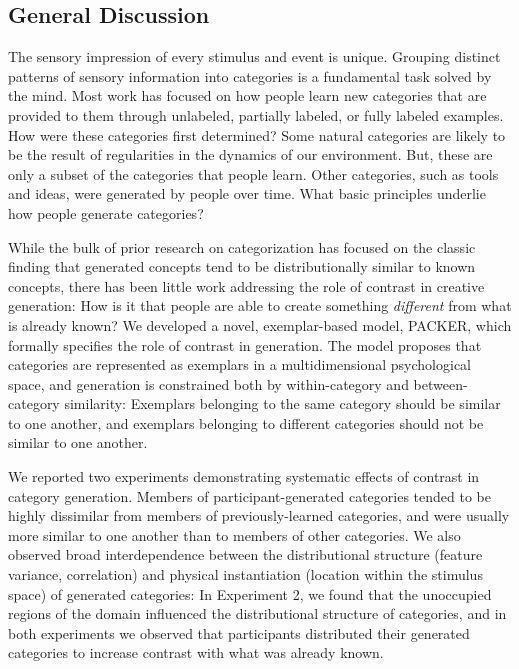\documentclass[12pt]{article}
\newcommand\jlanote[1]{\todo[inline, backgroundcolor = lime]{\textbf{JLA}: #1}}
\begin{document}
\begin{flushleft}


\section{General Discussion}
The sensory impression of every stimulus and event is unique. Grouping distinct patterns of sensory information into categories is a fundamental task solved by the mind. Most work has focused on how people learn new categories that are provided to them through unlabeled, partially labeled, or fully labeled examples. How were these categories first determined? Some natural categories are likely to be the result of regularities in the dynamics of our environment. But, these are only a subset of the categories that people learn. Other categories, such as tools and ideas, were generated by people over time. What basic principles underlie how people generate categories?

While the bulk of prior research on categorization has focused on the classic finding
that generated concepts tend to be distributionally similar to known concepts,
there has been little work addressing the role of contrast in creative
generation: How is it that people are able to create something {\em different}
from what is already known?
\jlanote{Update this next section:}
We developed a novel, exemplar-based model, PACKER,
which formally specifies the role of contrast in generation. The model proposes
that categories are represented as exemplars in a multidimensional psychological
space, and generation is constrained both by within-category and
between-category similarity: Exemplars belonging to the same category should be
similar to one another, and exemplars belonging to different categories should
not be similar to one another.

We reported two experiments demonstrating systematic
effects of contrast in category generation. Members of
participant-generated categories tended to be highly dissimilar from members of
previously-learned categories, and were usually more similar to one another than
to members of other categories. We also observed broad interdependence between
the distributional structure (feature variance, correlation) and physical
instantiation (location within the stimulus space) of generated categories: In
Experiment 2, we found that the unoccupied regions of the domain influenced the
distributional structure of categories, and in both experiments we observed that
participants distributed their generated categories to increase contrast with
what was already known.


\end{flushleft}
\end{document}
